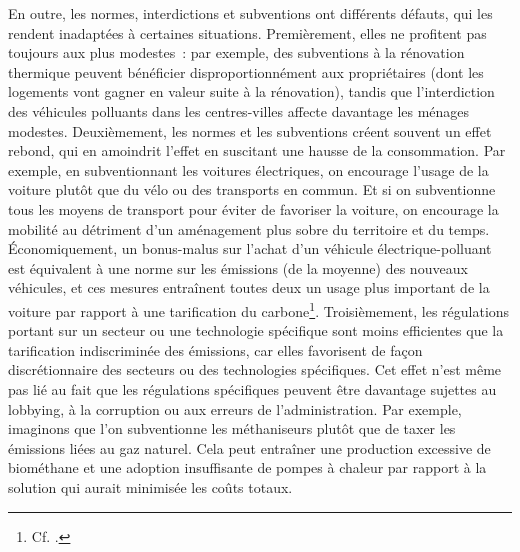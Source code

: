\documentclass[a5paper,french]{memoir}
\begin{document}
En outre, les normes, interdictions et subventions ont différents défauts, qui les rendent inadaptées à certaines situations. Premièrement, elles ne profitent pas toujours aux plus modestes~: par exemple, des subventions à la rénovation thermique peuvent bénéficier disproportionnément aux propriétaires (dont les logements vont gagner en valeur suite à la rénovation), tandis que l'interdiction des véhicules polluants dans les centres-villes affecte davantage les ménages modestes. Deuxièmement, les normes et les subventions créent souvent un effet rebond, qui en amoindrit l'effet en suscitant une hausse de la consommation. Par exemple, en subventionnant les voitures électriques, on encourage l'usage de la voiture plutôt que du vélo ou des transports en commun. Et si on subventionne tous les moyens de transport pour éviter de favoriser la voiture, on encourage la mobilité au détriment d'un aménagement plus sobre du territoire et du temps. %
Économiquement, un bonus-malus sur l'achat d'un véhicule électrique-polluant est équivalent à une norme sur les émissions (de la moyenne) des nouveaux véhicules, et ces mesures entraînent toutes deux un usage plus important de la voiture par rapport à une tarification du carbone\footnote{Cf. \cite{fullerton_suggested_2003}.}. Troisièmement, les régulations portant sur un secteur ou une technologie spécifique sont moins efficientes que la tarification indiscriminée des émissions, car elles favorisent de façon discrétionnaire des secteurs ou des technologies spécifiques. Cet effet n'est même pas lié au fait que les régulations spécifiques peuvent être davantage sujettes au lobbying, à la corruption ou aux erreurs de l'administration. Par exemple, imaginons que l'on subventionne les méthaniseurs plutôt que de taxer les émissions liées au gaz naturel. Cela peut entraîner une production excessive de biométhane et une adoption insuffisante de pompes à chaleur par rapport à la solution qui aurait minimisée les coûts totaux. 
\end{document}

